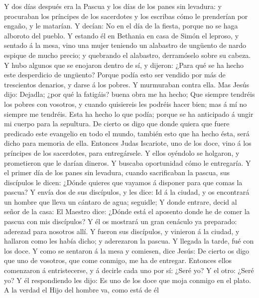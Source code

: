  Y dos días después era la Pascua y los días de los panes
sin levadura: y procuraban los príncipes de los sacerdotes y los
escribas cómo le prenderían por engaño, y le matarían.  Y
decían: No en el día de la fiesta, porque no se haga alboroto del
pueblo.  Y estando él en Bethania en casa de Simón el
leproso, y sentado á la mesa, vino una mujer teniendo un alabastro de
ungüento de nardo espique de mucho precio; y quebrando el alabastro,
derramóselo sobre su cabeza.  Y hubo algunos que se enojaron
dentro de sí, y dijeron: ¿Para qué se ha hecho este desperdicio de
ungüento?  Porque podía esto ser vendido por más de
trescientos denarios, y darse á los pobres. Y murmuraban contra ella.
 Mas Jesús dijo: Dejadla; ¿por qué la fatigáis? buena obra
me ha hecho;  Que siempre tendréis los pobres con vosotros,
y cuando quisiereis les podréis hacer bien; mas á mí no siempre me
tendréis.  Esta ha hecho lo que podía; porque se ha
anticipado á ungir mi cuerpo para la sepultura.  De cierto
os digo que donde quiera que fuere predicado este evangelio en todo el
mundo, también esto que ha hecho ésta, será dicho para memoria de ella.
 Entonces Judas Iscariote, uno de los doce, vino á los
príncipes de los sacerdotes, para entregársele.  Y ellos
oyéndolo se holgaron, y prometieron que le darían dineros. Y buscaba
oportunidad cómo le entregaría.  Y el primer día de los
panes sin levadura, cuando sacrificaban la pascua, sus discípulos le
dicen: ¿Dónde quieres que vayamos á disponer para que comas la pascua?
 Y envía dos de sus discípulos, y les dice: Id á la ciudad,
y os encontrará un hombre que lleva un cántaro de agua; seguidle;
 Y donde entrare, decid al señor de la casa: El Maestro
dice: ¿Dónde está el aposento donde he de comer la pascua con mis
discípulos?  Y él os mostrará un gran cenáculo ya
preparado: aderezad para nosotros allí.  Y fueron sus
discípulos, y vinieron á la ciudad, y hallaron como les había dicho; y
aderezaron la pascua.  Y llegada la tarde, fué con los
doce.  Y como se sentaron á la mesa y comiesen, dice Jesús:
De cierto os digo que uno de vosotros, que come conmigo, me ha de
entregar.  Entonces ellos comenzaron á entristecerse, y á
decirle cada uno por sí: ¿Seré yo? Y el otro: ¿Seré yo?  Y
él respondiendo les dijo: Es uno de los doce que moja conmigo en el
plato.  A la verdad el Hijo del hombre va, como está de él
